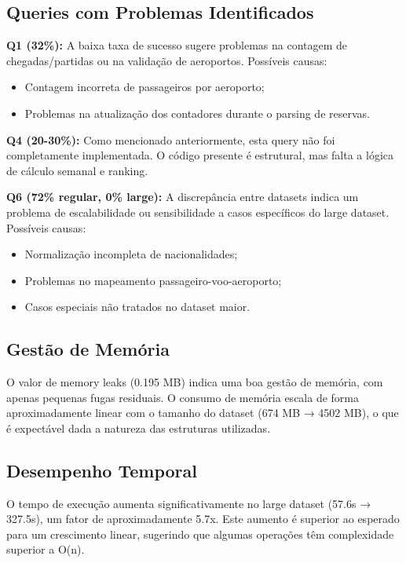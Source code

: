 \documentclass[a4paper,12pt]{scrreprt}
\begin{document}
\subsection{Queries com Problemas Identificados}

\textbf{Q1 (32\%):} A baixa taxa de sucesso sugere problemas na contagem de chegadas/partidas ou na validação de aeroportos. Possíveis causas:
\begin{itemize}
    \item Contagem incorreta de passageiros por aeroporto;
    \item Problemas na atualização dos contadores durante o parsing de reservas.
\end{itemize}

\textbf{Q4 (20-30\%):} Como mencionado anteriormente, esta query não foi completamente implementada. O código presente é estrutural, mas falta a lógica de cálculo semanal e ranking.

\textbf{Q6 (72\% regular, 0\% large):} A discrepância entre datasets indica um problema de escalabilidade ou sensibilidade a casos específicos do large dataset. Possíveis causas:
\begin{itemize}
    \item Normalização incompleta de nacionalidades;
    \item Problemas no mapeamento passageiro-voo-aeroporto;
    \item Casos especiais não tratados no dataset maior.
\end{itemize}

\subsection{Gestão de Memória}

O valor de memory leaks (0.195 MB) indica uma boa gestão de memória, com apenas pequenas fugas residuais. O consumo de memória escala de forma aproximadamente linear com o tamanho do dataset (674 MB → 4502 MB), o que é expectável dada a natureza das estruturas utilizadas.

\subsection{Desempenho Temporal}

O tempo de execução aumenta significativamente no large dataset (57.6s → 327.5s), um fator de aproximadamente 5.7x. Este aumento é superior ao esperado para um crescimento linear, sugerindo que algumas operações têm complexidade superior a O(n).
\end{document}
